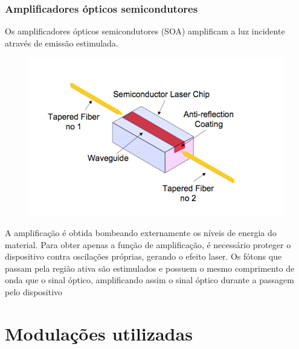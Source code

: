 \documentclass[article]{IEEEtran}
\begin{document}
\subsubsection{Amplificadores ópticos semicondutores}
Os amplificadores ópticos semicondutores (SOA) amplificam a luz incidente através de emissão estimulada.


\begin{figure}[h]
\includegraphics[width=\columnwidth]{soa.jpg}
\end{figure}

A amplificação é obtida bombeando externamente os níveis de energia do material. Para obter apenas a função de amplificação, é necessário proteger o dispositivo contra oscilações próprias, gerando o efeito laser.
Os fótons que passam pela região ativa são estimulados e possuem o mesmo comprimento de onda que o sinal óptico, amplificando assim o sinal óptico durante a passagem pelo dispositivo
\section{Modulações utilizadas}
\end{document}
